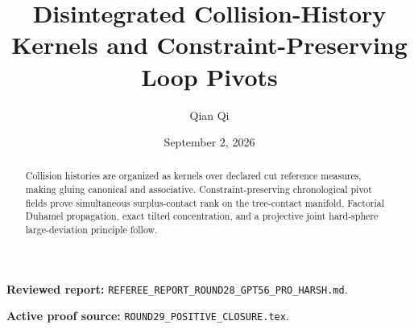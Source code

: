 \documentclass[11pt,reqno]{amsart}
\title[B2 Round 29 revision]{Disintegrated Collision-History Kernels and Constraint-Preserving Loop Pivots}
\author{Qian Qi}
\date{September 2, 2026}
\begin{document}
\begin{abstract}Collision histories are organized as kernels over declared cut reference measures, making gluing canonical and associative. Constraint-preserving chronological pivot fields prove simultaneous surplus-contact rank on the tree-contact manifold. Factorial Duhamel propagation, exact tilted concentration, and a projective joint hard-sphere large-deviation principle follow.\end{abstract}
\maketitle
\noindent\textbf{Reviewed report:} \texttt{REFEREE\_REPORT\_ROUND28\_GPT56\_PRO\_HARSH.md}.\par
\noindent\textbf{Active proof source:} \texttt{ROUND29\_POSITIVE\_CLOSURE.tex}.\par

\end{document}
